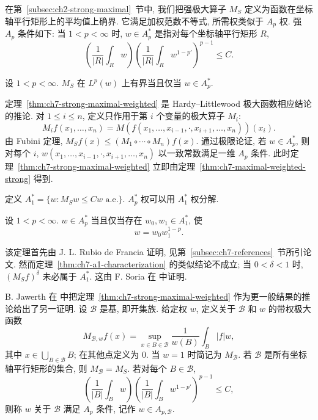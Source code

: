 在第~\ref{subsec:ch2-strong-maximal}~节中, 我们把强极大算子 $M_S$ 定义为函数在坐标轴平行矩形上的平均值上确界. 它满足加权范数不等式, 所需权类似于 $A_p$ 权. 强 $A_p$ 条件如下: 当 $1<p<\infty$ 时, $w\in A_p^*$ 是指对每个坐标轴平行矩形 $R$,
\[
 \left(\frac1{|R|}\int_Rw\right)
 \left(\frac1{|R|}\int_Rw^{1-p'}\right)^{p-1}\le C.
\]

\begin{Theorem}
\label{thm:ch7-strong-maximal-weighted}
设 $1<p<\infty$. $M_S$ 在 $L^p(w)$ 上有界当且仅当 $w\in A_p^*$.
\end{Theorem}

\hypertarget{chapter-07-page-165}{}
定理~\ref{thm:ch7-strong-maximal-weighted} 是 Hardy--Littlewood 极大函数相应结论的推论. 对 $1\le i\le n$, 定义只作用于第 $i$ 个变量的极大算子 $M_i$:
\[
 M_if(x_1,\ldots,x_n)
 =M(f(x_1,\ldots,x_{i-1},\cdot,x_{i+1},\ldots,x_n))(x_i).
\]
由 Fubini 定理, $M_Sf(x)\le(M_1\circ\cdots\circ M_n)f(x)$. 通过极限论证, 若 $w\in A_p^*$, 则对每个 $i$, $w(x_1,\ldots,x_{i-1},\cdot,x_{i+1},\ldots,x_n)$ 以一致常数满足一维 $A_p$ 条件. 此时定理~\ref{thm:ch7-strong-maximal-weighted} 立即由定理~\ref{thm:ch7-maximal-weighted-strong} 得到.

定义 $A_1^*=\{w:M_Sw\le Cw\text{ a.e.}\}$. $A_p^*$ 权可以用 $A_1^*$ 权分解.

\begin{Theorem}
\label{thm:ch7-strong-ap-factorization}
设 $1<p<\infty$. $w\in A_p^*$ 当且仅当存在 $w_0,w_1\in A_1^*$, 使
\[
 w=w_0w_1^{1-p}.
\]
\end{Theorem}

该定理首先由 J. L. Rubio de Francia 证明, 见第~\ref{subsec:ch7-references}~节所引论文. 然而定理~\ref{thm:ch7-a1-characterization} 的类似结论不成立; 当 $0<\delta<1$ 时, $(M_Sf)^\delta$ 未必属于 $A_1^*$. 这由 F. Soria 在  中证明.

B. Jawerth 在  中把定理~\ref{thm:ch7-strong-maximal-weighted} 作为更一般结果的推论给出了另一证明. 设 $\mathcal B$ 是基, 即开集族. 给定权 $w$, 定义关于 $\mathcal B$ 和 $w$ 的带权极大函数
\[
 M_{\mathcal B,w}f(x)
 =\sup_{x\in B\in\mathcal B}\frac1{w(B)}\int_B|f|w,
\]
其中 $x\in\bigcup_{B\in\mathcal B}B$; 在其他点定义为 $0$. 当 $w=1$ 时简记为 $M_\mathcal B$. 若 $\mathcal B$ 是所有坐标轴平行矩形的集合, 则 $M_\mathcal B=M_S$. 若对每个 $B\in\mathcal B$,
\[
 \left(\frac1{|B|}\int_Bw\right)
 \left(\frac1{|B|}\int_Bw^{1-p'}\right)^{p-1}\le C,
\]
则称 $w$ 关于 $\mathcal B$ 满足 $A_p$ 条件, 记作 $w\in A_{p,\mathcal B}$.

